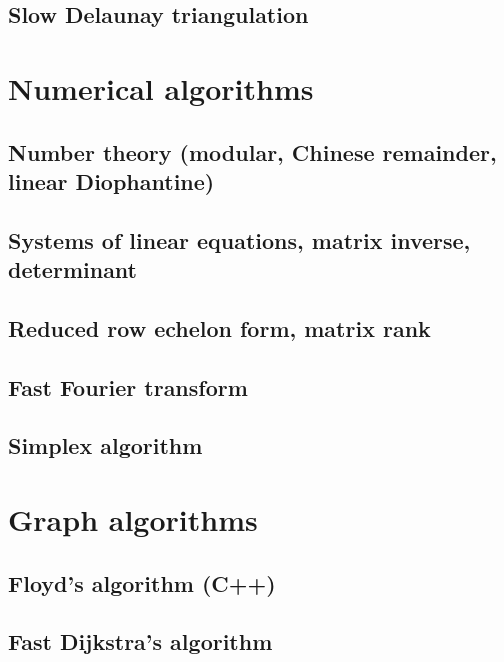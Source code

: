 \subsection{Slow Delaunay triangulation}
\raggedbottom
\hrulefill

\section{Numerical algorithms}
\subsection{Number theory (modular, Chinese remainder, linear Diophantine)}
\raggedbottom
\hrulefill
\subsection{Systems of linear equations, matrix inverse, determinant}
\raggedbottom
\hrulefill
\subsection{Reduced row echelon form, matrix rank}
\raggedbottom
\hrulefill
\subsection{Fast Fourier transform}
\raggedbottom
\hrulefill
\subsection{Simplex algorithm}
\raggedbottom
\hrulefill

\section{Graph algorithms}
\subsection{Floyd's algorithm (C++)}
\raggedbottom
\hrulefill
\subsection{Fast Dijkstra's algorithm}
\raggedbottom
\hrulefill
